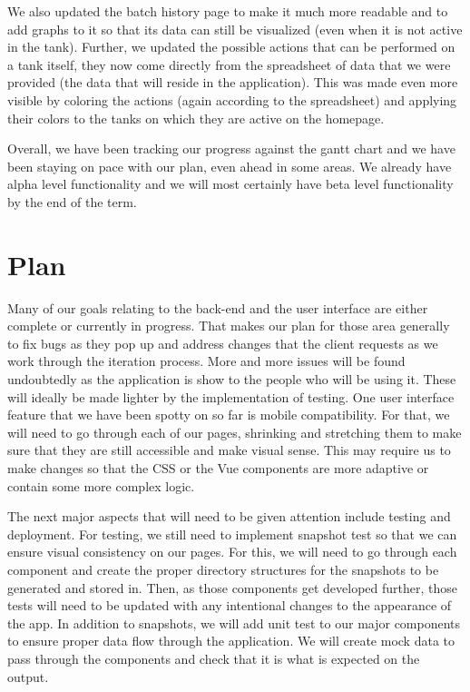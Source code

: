\documentclass[draftclsnofoot,onecolumn,journal,letterpaper,compsoc,10pt]{IEEEtran}
\begin{document}
We also updated the batch history page to make it much more readable and to add graphs to it so that its data can still be visualized (even when it is not active in the tank).  Further, we updated the possible actions that can be performed on a tank itself, they now come directly from the spreadsheet of data that we were provided (the data that will reside in the application).  This was made even more visible by coloring the actions (again according to the spreadsheet) and applying their colors to the tanks on which they are active on the homepage.

Overall, we have been tracking our progress against the gantt chart and we have been staying on pace with our plan, even ahead in some areas.  We already have alpha level functionality and we will most certainly have beta level functionality by the end of the term.

\section{Plan}
Many of our goals relating to the back-end and the user interface are either complete or currently in progress. That makes our plan for those area generally to fix bugs as they pop up and address changes that the client requests as we work through the iteration process. More and more issues will be found undoubtedly as the application is show to the people who will be using it. These will ideally be made lighter by the implementation of testing. One user interface feature that we have been spotty on so far is mobile compatibility. For that, we will need to go through each of our pages, shrinking and stretching them to make sure that they are still accessible and make visual sense. This may require us to make changes so that the CSS or the Vue components are more adaptive or contain some more complex logic.

The next major aspects that will need to be given attention include testing and deployment. For testing, we still need to implement snapshot test so that we can ensure visual consistency on our pages. For this, we will need to go through each component and create the proper directory structures for the snapshots to be generated and stored in. Then, as those components get developed further, those tests will need to be updated with any intentional changes to the appearance of the app. In addition to snapshots, we will add unit test to our major components to ensure proper data flow through the application. We will create mock data to pass through the components and check that it is what is expected on the output.
\end{document}
